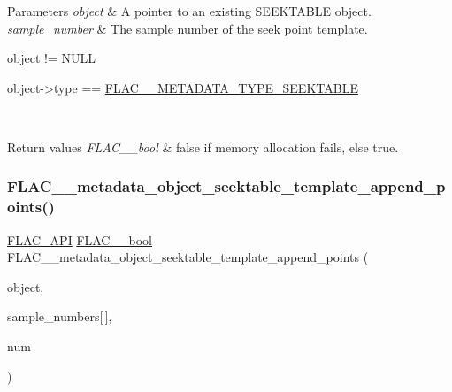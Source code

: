 \begin{DoxyParams}{Parameters}
{\em object} & A pointer to an existing S\+E\+E\+K\+T\+A\+B\+LE object. \\
\hline
{\em sample\+\_\+number} & The sample number of the seek point template.  
\begin{DoxyCode}
\textcolor{keywordtype}{object} != NULL 
\end{DoxyCode}
 
\begin{DoxyCode}
\textcolor{keywordtype}{object}->type == \hyperlink{group__flac__format_ggac71714ba8ddbbd66d26bb78a427fac01a5f6323e489be1318f0e3747960ebdd91}{FLAC\_\_METADATA\_TYPE\_SEEKTABLE} 
\end{DoxyCode}
 \\
\hline
\end{DoxyParams}

\begin{DoxyRetVals}{Return values}
{\em F\+L\+A\+C\+\_\+\+\_\+bool} & {\ttfamily false} if memory allocation fails, else {\ttfamily true}. \\
\hline
\end{DoxyRetVals}
\mbox{\label{group__flac__metadata__object_gac27a59879fa8cdf47b75f8d73de82f0e}} 
\subsubsection{\texorpdfstring{F\+L\+A\+C\+\_\+\+\_\+metadata\+\_\+object\+\_\+seektable\+\_\+template\+\_\+append\+\_\+points()}{FLAC\_\_metadata\_object\_seektable\_template\_append\_points()}}
{\footnotesize\ttfamily \hyperlink{group__flac__export_ga56ca07df8a23310707732b1c0007d6f5}{F\+L\+A\+C\+\_\+\+A\+PI} \hyperlink{ordinals_8h_a95103469f1cbd78b8cf250194985b34e}{F\+L\+A\+C\+\_\+\+\_\+bool} F\+L\+A\+C\+\_\+\+\_\+metadata\+\_\+object\+\_\+seektable\+\_\+template\+\_\+append\+\_\+points (\begin{DoxyParamCaption}\item[{\hyperlink{struct_f_l_a_c_____stream_metadata}{F\+L\+A\+C\+\_\+\+\_\+\+Stream\+Metadata} $\ast$}]{object,  }\item[{\hyperlink{ordinals_8h_aa78c8c70a3eb8a58af7436f278acde8e}{F\+L\+A\+C\+\_\+\+\_\+uint64}}]{sample\+\_\+numbers\mbox{[}$\,$\mbox{]},  }\item[{unsigned}]{num }\end{DoxyParamCaption})}

